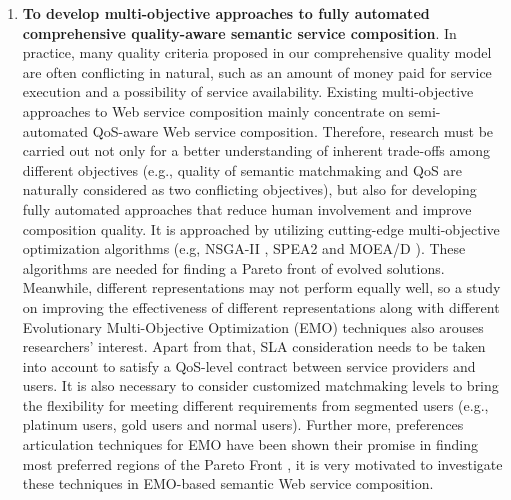 \begin{enumerate}
 \item \label{Obj:2} \textbf{To develop multi-objective approaches to fully automated comprehensive quality-aware semantic service composition}. In practice, many quality criteria proposed in our comprehensive quality model are often conflicting in natural, such as an amount of money paid for service execution and a possibility of service availability. Existing multi-objective approaches \cite{chen2014partial,xiang2014qos,yin2014hybrid,liu2005dynamic,yu2013efficient,zhang2010qos} to Web service composition mainly concentrate on semi-automated QoS-aware Web service composition. Therefore, research must be carried out not only for a better understanding of inherent trade-offs among different objectives (e.g., quality of semantic matchmaking and QoS are naturally considered as two conflicting objectives), but also for developing fully automated approaches that reduce human involvement and improve composition quality. It is approached by utilizing cutting-edge multi-objective optimization algorithms (e.g, NSGA-II \cite{deb2002fast}, SPEA2 \cite{zitzler2001spea2} and MOEA/D \cite{zhang2007moea}). These algorithms are needed for finding a Pareto front of evolved solutions. Meanwhile, different representations may not perform equally well, so a study on improving the effectiveness of different representations along with different Evolutionary Multi-Objective Optimization (EMO) techniques also arouses researchers' interest. Apart from that, SLA consideration needs to be taken into account to satisfy a QoS-level contract between service providers and users. It is also necessary to consider customized matchmaking levels to bring the flexibility for meeting different requirements from segmented users (e.g., platinum users, gold users and normal users). Further more, preferences articulation techniques for EMO have been shown their promise in finding most preferred regions of the Pareto Front \cite{branke2016using,branke2005integrating,branke2001guidance,cheng2015reference,giagkiozis2014pareto}, it is very motivated to investigate these techniques in EMO-based semantic Web service composition.
 
   \begin{enumerate}
   

\end{enumerate}
\end{enumerate}
